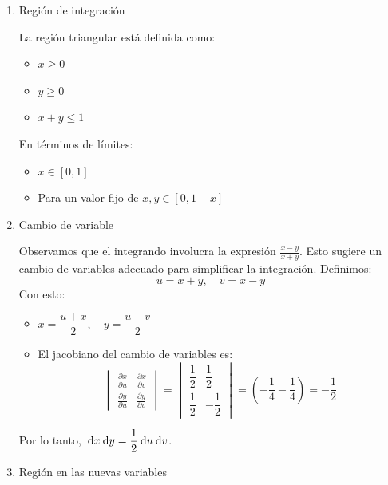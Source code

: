 \begin{enumerate}[label=\color{red}\textbf{\arabic*)}, leftmargin=*]
\begin{center}
\end{center}

\begin{enumerate}[label=Paso \arabic*:]
  \item Región de integración

    La región triangular está definida como: 
    \begin{itemize}[label=\textbullet]
      \item $x\ge 0$
      \item $y\ge 0$
      \item $x+y\le 1$
    \end{itemize}
    En términos de límites:
    \begin{itemize}[label=\textbullet]
      \item $x \in [0,1]$
      \item Para un valor fijo de $x,y\in [0, 1-x]$
    \end{itemize}
  \item Cambio de variable

    Observamos que el integrando involucra la expresión $\frac{x-y}{x+y}$. Esto sugiere un cambio de variables adecuado para simplificar la integración. Definimos: \[
    u=x+y,\quad v=x-y
    \] 
    Con esto:
    \begin{itemize}[label=\textbullet]
      \item $x=\dfrac{u+x}{2},\quad y=\dfrac{u-v}{2}  $
      \item El jacobiano del cambio de variables es:
        \[
        \begin{vmatrix}
          \frac{\partial x}{\partial u} & \frac{\partial x}{\partial v} \\
            \frac{\partial y}{\partial u} & \frac{\partial y}{\partial v} 
        \end{vmatrix} = \begin{vmatrix} 
            \dfrac{1}{2} & \dfrac{1}{2}\\
            \dfrac{1}{2} & -\dfrac{1}{2}
        \end{vmatrix} =\left( -\dfrac{1}{4}-\dfrac{1}{4} \right)=-\dfrac{1}{2} 
        \] 
    \end{itemize}
    Por lo tanto, $\:\mathrm{d}x \:\mathrm{d}y =\dfrac{1}{2}\:\mathrm{d}u \:\mathrm{d}v $.
  \item Región en las nuevas variables


\end{enumerate}
\end{enumerate}
